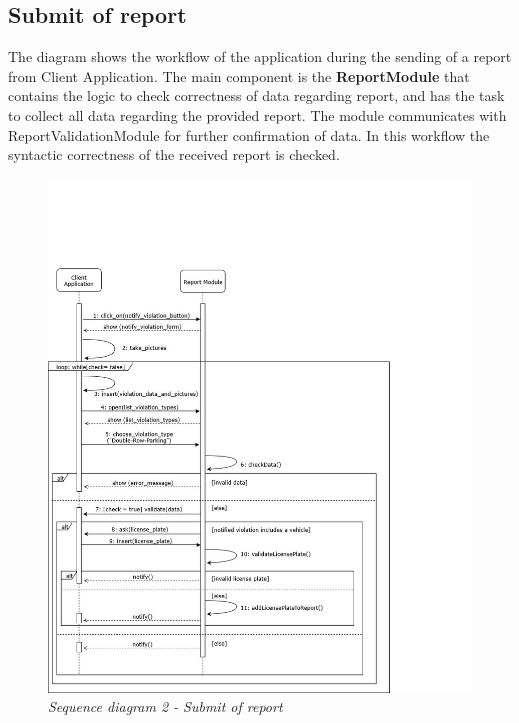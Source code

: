 \subsection{Submit of report}
The diagram shows the workflow of the application during the sending of a report from Client Application. The main 
component is the \textbf{ReportModule} that contains the logic to check correctness of data regarding report, and has the task to collect all
data regarding the provided report. The module communicates with ReportValidationModule for further confirmation of data. In this workflow 
the syntactic correctness of the received report is checked.  

\begin{figure}[H]
  \centering
  \includegraphics[width=\textwidth]{DD_Images/RuntimeView/2.jpg}
  \caption{\textit{Sequence diagram 2 - Submit of report}}
\end{figure}

